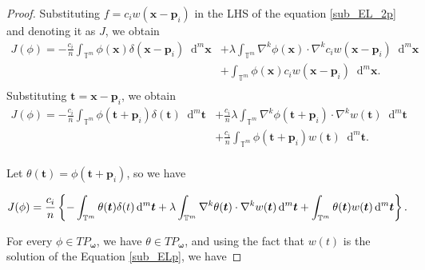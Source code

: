 \documentclass[multixcb]{amstext-l}
\theoremstyle{plain}
\theoremstyle{definition}
\theoremstyle{definition}
\theoremstyle{remark}
\numberwithin{equation}{chapter}
\begin{document}
\begin{appendix}
\begin{proof}
Substituting $f = c_iw(\boldsymbol{x}-\boldsymbol{p}_i)$ in the LHS of the equation \ref{sub_EL_2p} and  denoting it as $J$, we obtain 
\begin{equation}
\label{der_sub_EL_1p}
\begin{aligned}
J(\phi) = -\frac{c_i}{n}\int_{\mathbb{T}^m} \phi(\boldsymbol{x})\delta(\boldsymbol{x}-\boldsymbol{p}_i)\mathop{}\!\mathrm{d}^m\boldsymbol{x} &+ \lambda\int_{\mathbb{T}^m} \nabla^k\phi(\boldsymbol{x})\cdot\nabla^k c_iw(\boldsymbol{x}-\boldsymbol{p}_i)\mathop{}\!\mathrm{d}^m\boldsymbol{x}\\
&+ \int_{\mathbb{T}^m} \phi(\boldsymbol{x})c_iw(\boldsymbol{x}-\boldsymbol{p}_i)\mathop{}\!\mathrm{d}^m\boldsymbol{x}.\\
\end{aligned}
\end{equation}
Substituting $\boldsymbol{t} = \boldsymbol{x}-\boldsymbol{p}_i$, we obtain
\begin{equation}
    \label{der_sub_EL_2p}
    \begin{aligned}
     J(\phi) = -\frac{c_i}{n}\int_{\mathbb{T}^m} \phi(\boldsymbol{t}+\boldsymbol{p}_i)\delta(\boldsymbol{t})\mathop{}\!\mathrm{d}^m\boldsymbol{t} &+ \frac{c_i}{n}\lambda\int_{\mathbb{T}^m} \nabla^k\phi(\boldsymbol{t}+\boldsymbol{p}_i)\cdot\nabla^k w(\boldsymbol{t})\mathop{}\!\mathrm{d}^m\boldsymbol{t}\\
     &+ \frac{c_i}{n}\int_{\mathbb{T}^m} \phi(\boldsymbol{t}+\boldsymbol{p}_i)w(\boldsymbol{t})\mathop{}\!\mathrm{d}^m\boldsymbol{t}.\\
     \end{aligned}
\end{equation}

Let $\theta(\boldsymbol{t}) = \phi(\boldsymbol{t}+\boldsymbol{p}_i)$, so we have 

\begin{equation}
    \label{der_sub_EL_3p}
     J(\phi) = \frac{c_i}{n}\left\{-\int_{\mathbb{T}^m} \theta(\boldsymbol{t})\delta(t)\mathop{}\!\mathrm{d}^m\boldsymbol{t} + \lambda\int_{\mathbb{T}^m} \nabla^k\theta(\boldsymbol{t})\cdot\nabla^k w(\boldsymbol{t})\mathop{}\!\mathrm{d}^m\boldsymbol{t} + \int_{\mathbb{T}^m} \theta(\boldsymbol{t})w(\boldsymbol{t})\mathop{}\!\mathrm{d}^m\boldsymbol{t}\right\}.\\
\end{equation}



For every $\phi \in TP_{\boldsymbol{\omega}}$, we have $\theta \in TP_{\boldsymbol{\omega}}$, and using the fact that $w(t)$ is the solution of the Equation \ref{sub_ELp}, we have


\end{proof}
\end{appendix}
\end{document}
